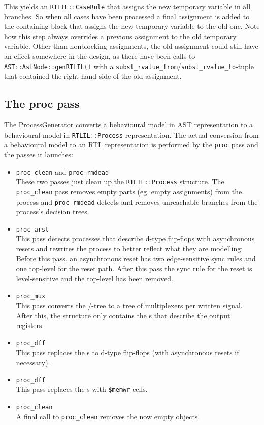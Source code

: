 This yields an \lstinline[language=C++]{RTLIL::CaseRule} that assigns the new temporary variable in all branches.
So when all cases have been processed a final assignment is added to the containing block that assigns the new
temporary variable to the old one. Note how this step always overrides a previous assignment to the old temporary
variable. Other than nonblocking assignments, the old assignment could still have an effect somewhere
in the design, as there have been calls to \lstinline[language=C++]{AST::AstNode::genRTLIL()} with a
\lstinline[language=C++]{subst_rvalue_from}/\lstinline[language=C++]{subst_rvalue_to}-tuple that contained
the right-hand-side of the old assignment.

\subsection{The proc pass}

The ProcessGenerator converts a behavioural model in AST representation to a behavioural model in
\lstinline[language=C++]{RTLIL::Process} representation. The actual conversion from a behavioural
model to an RTL representation is performed by the {\tt proc} pass and the passes it launches:

\begin{itemize}
\item {\tt proc\_clean} and {\tt proc\_rmdead} \\
These two passes just clean up the \lstinline[language=C++]{RTLIL::Process} structure. The {\tt proc\_clean}
pass removes empty parts (eg. empty assignments) from the process and {\tt proc\_rmdead} detects and removes
unreachable branches from the process's decision trees.
%
\item {\tt proc\_arst} \\
This pass detects processes that describe d-type flip-flops with asynchronous
resets and rewrites the process to better reflect what they are modelling:
Before this pass, an asynchronous reset has two edge-sensitive sync rules and
one top-level  for the reset path. After this pass the
sync rule for the reset is level-sensitive and the top-level
 has been removed.
%
\item {\tt proc\_mux} \\
This pass converts the /-tree to a tree
of multiplexers per written signal. After this, the  structure only contains
the s that describe the output registers.
%
\item {\tt proc\_dff} \\
This pass replaces the s to d-type flip-flops (with
asynchronous resets if necessary).
%
\item {\tt proc\_dff} \\
This pass replaces the s with {\tt \$memwr} cells.
%
\item {\tt proc\_clean} \\
A final call to {\tt proc\_clean} removes the now empty  objects.
\end{itemize}

